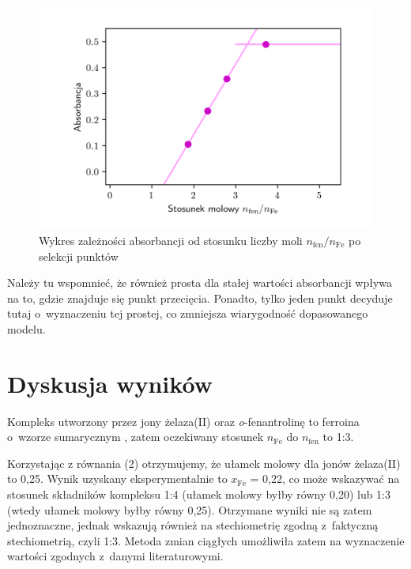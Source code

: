 \documentclass[12pt]{article}
\begin{document}
\begin{figure}[H]
    \begin{center}
        \includegraphics{ChFizLab_R3_A(nAnB)2.png}
    \end{center}
    \caption{Wykres zależności absorbancji od stosunku liczby moli $n_{\mathrm{fen}}/n_{\mathrm{Fe}}$ po selekcji punktów}
    \label{AnAnB2}
\end{figure}

Należy tu wspomnieć, że również prosta dla stałej wartości absorbancji wpływa na to, gdzie znajduje się punkt przecięcia. Ponadto, tylko jeden punkt decyduje tutaj o~wyznaczeniu tej prostej, co zmniejsza wiarygodność dopasowanego modelu.




\section{Dyskusja wyników}

 Kompleks utworzony przez jony żelaza(II) oraz \textit{o}-fenantrolinę to ferroina o~wzorze sumarycznym  \cite{1}, zatem oczekiwany stosunek $n_{\mathrm{Fe}}$ do $n_{\mathrm{fen}}$ to 1:3.

Korzystając z równania (2) otrzymujemy, że ułamek molowy dla jonów żelaza(II) to 0,25. Wynik uzyskany eksperymentalnie to $x_{\mathrm{Fe}}$ = 0,22, co może wskazywać na stosunek składników kompleksu 1:4 (ułamek molowy byłby równy 0,20) lub 1:3 (wtedy ułamek molowy byłby równy 0,25). Otrzymane wyniki nie są zatem jednoznaczne, jednak wskazują również na stechiometrię zgodną z~faktyczną stechiometrią, czyli 1:3. Metoda zmian ciągłych umożliwiła zatem na wyznaczenie wartości zgodnych z~danymi literaturowymi.
\end{document}
